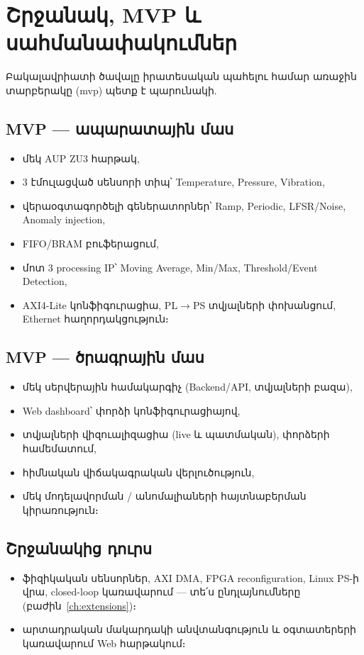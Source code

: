 \chapter{Շրջանակ, MVP և սահմանափակումներ}
\label{ch:scope}

Բակալավրիատի ծավալը իրատեսական պահելու համար առաջին տարբերակը (\gls{mvp}) պետք է պարունակի.

\section{MVP — ապարատային մաս}
\begin{itemize}
  \item մեկ AUP ZU3 հարթակ,
  \item 3 էմուլացված սենսորի տիպ՝ Temperature, Pressure, Vibration,
  \item վերաօգտագործելի գեներատորներ՝ Ramp, Periodic, LFSR/Noise, Anomaly injection,
  \item FIFO/BRAM բուֆերացում,
  \item մոտ 3 processing IP՝ Moving Average, Min/Max, Threshold/Event Detection,
  \item AXI4-Lite կոնֆիգուրացիա, PL$\rightarrow$PS տվյալների փոխանցում, Ethernet հաղորդակցություն։
\end{itemize}

\section{MVP — ծրագրային մաս}
\begin{itemize}
  \item մեկ սերվերային համակարգիչ (Backend/API, տվյալների բազա),
  \item Web dashboard՝ փորձի կոնֆիգուրացիայով,
  \item տվյալների վիզուալիզացիա (live և պատմական), փորձերի համեմատում,
  \item հիմնական վիճակագրական վերլուծություն,
  \item մեկ մոդելավորման / անոմալիաների հայտնաբերման կիրառություն։
\end{itemize}

\section{Շրջանակից դուրս}
\begin{itemize}
  \item ֆիզիկական սենսորներ, AXI DMA, FPGA reconfiguration, Linux PS-ի վրա, closed-loop կառավարում — տե՛ս ընդլայնումները (բաժին~\ref{ch:extensions})։
  \item արտադրական մակարդակի անվտանգություն և օգտատերերի կառավարում Web հարթակում։
\end{itemize}

